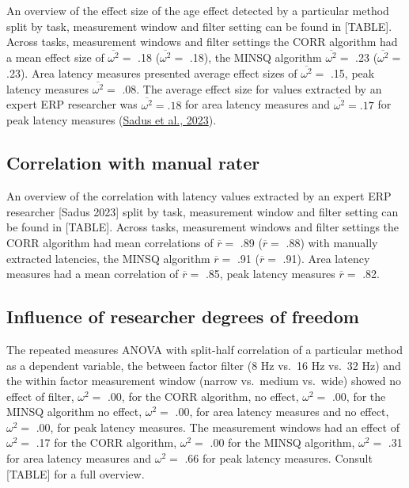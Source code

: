\documentclass[
  man]{apa7}
\begin{document}
An overview of the effect size of the age effect detected by a particular method split by task, measurement window and filter setting can be found in {[}TABLE{]}. Across tasks, measurement windows and filter settings the CORR algorithm had a mean effect size of \(\overline{\omega^2} =\) .18 (\(\overline{\omega^2} =\) .18), the MINSQ algorithm \(\overline{\omega^2} =\) .23 (\(\overline{\omega^2} =\) .23). Area latency measures presented average effect sizes of \(\overline{\omega^2} =\) .15, peak latency measures \(\overline{\omega^2} =\) .08. The average effect size for values extracted by an expert ERP researcher was \(\overline{\omega^2} = .18\) for area latency measures and \(\overline{\omega^2} = .17\) for peak latency measures (\protect\hyperlink{ref-sadus2023multiverse}{Sadus et al., 2023}).

\hypertarget{correlation-with-manual-rater}{%
\subsection{Correlation with manual rater}\label{correlation-with-manual-rater}}

An overview of the correlation with latency values extracted by an expert ERP researcher {[}Sadus 2023{]} split by task, measurement window and filter setting can be found in {[}TABLE{]}. Across tasks, measurement windows and filter settings the CORR algorithm had mean correlations of \(\overline{r} =\) .89 (\(\overline{r} =\) .88) with manually extracted latencies, the MINSQ algorithm \(\overline{r} =\) .91 (\(\overline{r} =\) .91). Area latency measures had a mean correlation of \(\overline{r} =\) .85, peak latency measures \(\overline{r} =\) .82.

\hypertarget{influence-of-researcher-degrees-of-freedom}{%
\subsection{Influence of researcher degrees of freedom}\label{influence-of-researcher-degrees-of-freedom}}

The repeated measures ANOVA with split-half correlation of a particular method as a dependent variable, the between factor filter (8 Hz vs.~16 Hz vs.~32 Hz) and the within factor measurement window (narrow vs.~medium vs.~wide) showed no effect of filter, \(\omega^2 =\) .00, for the CORR algorithm, no effect, \(\omega^2 =\) .00, for the MINSQ algorithm no effect, \(\omega^2 =\) .00, for area latency measures and no effect, \(\omega^2 =\) .00, for peak latency measures. The measurement windows had an effect of \(\omega^2 =\) .17 for the CORR algorithm, \(\omega^2 =\) .00 for the MINSQ algorithm, \(\omega^2 =\) .31 for area latency measures and \(\omega^2 =\) .66 for peak latency measures. Consult {[}TABLE{]} for a full overview.
\end{document}
